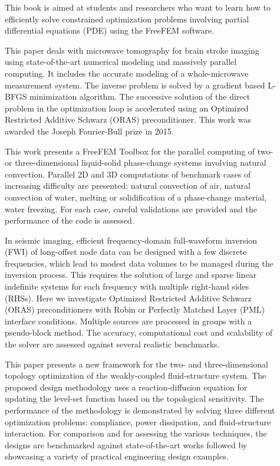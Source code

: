 \begin{description}
\item[] This book is aimed at students and researchers who want to learn how to eﬃciently solve constrained optimization problems involving partial diﬀerential equations (PDE) using the FreeFEM software.

\item[] This paper deals with microwave tomography for brain stroke imaging using state-of-the-art numerical modeling and massively parallel computing. It includes the accurate modeling of a whole-microwave measurement system. The inverse problem is solved by a gradient based L-BFGS minimization algorithm. The successive solution of the direct problem in the optimization loop is accelerated using an Optimized Restricted Additive Schwarz (ORAS) preconditioner. This work was awarded the Joseph Fourier-Bull prize in 2015.

\item[] This work presents a FreeFEM Toolbox for the parallel computing of two- or three-dimensional liquid-solid phase-change systems involving natural convection. Parallel 2D and 3D computations of benchmark cases of increasing difficulty are presented: natural convection of air, natural convection of water, melting or solidification of a phase-change material, water freezing. For each case, careful validations are provided and the performance of the code is assessed.

\item[] In seismic imaging, efficient frequency-domain full-waveform inversion (FWI) of long-offset node data can be designed with a few discrete frequencies, which lead to modest data volumes to be managed during the inversion process. This requires the solution of large and sparse linear indefinite systems for each frequency with multiple right-hand sides (RHSs). Here we investigate Optimized Restricted Additive Schwarz (ORAS) preconditioners with Robin or Perfectly Matched Layer (PML) interface conditions. Multiple sources are processed in groups with a pseudo-block method. The accuracy, computational cost and scalability of the solver are assessed against several realistic benchmarks.

\item[] This paper presents a new framework for the two- and three-dimensional topology optimization of the weakly-coupled fluid-structure system. The proposed design methodology uses a reaction-diffusion equation for updating the level-set function based on the topological sensitivity. The performance of the methodology is demonstrated by solving three different optimization problems: compliance, power dissipation, and fluid-structure interaction. For comparison and for assessing the various techniques, the designs are benchmarked against state-of-the-art works followed by showcasing a variety of practical engineering design examples.


\end{description}
